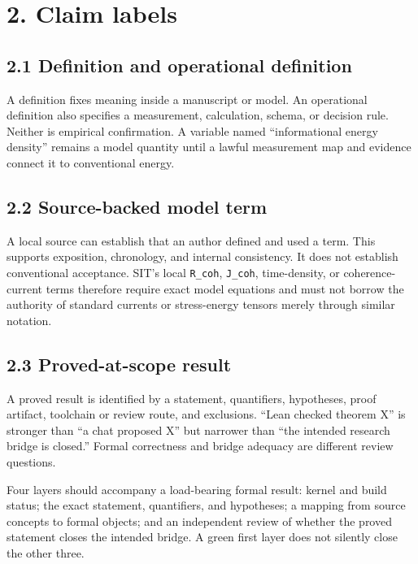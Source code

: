 \documentclass[
  american,
  11pt,
  letterpaper,
]{article}
\begin{document}
\section{2. Claim labels}\label{claim-labels}

\subsection{2.1 Definition and operational definition}\label{definition-and-operational-definition}

A definition fixes meaning inside a manuscript or model. An operational definition also specifies a measurement, calculation, schema, or decision rule. Neither is empirical confirmation. A variable named ``informational energy density'' remains a model quantity until a lawful measurement map and evidence connect it to conventional energy.

\subsection{2.2 Source-backed model term}\label{source-backed-model-term}

A local source can establish that an author defined and used a term. This supports exposition, chronology, and internal consistency. It does not establish conventional acceptance. SIT's local \texttt{R\_coh}, \texttt{J\_coh}, time-density, or coherence-current terms therefore require exact model equations and must not borrow the authority of standard currents or stress-energy tensors merely through similar notation.

\subsection{2.3 Proved-at-scope result}\label{proved-at-scope-result}

A proved result is identified by a statement, quantifiers, hypotheses, proof artifact, toolchain or review route, and exclusions. ``Lean checked theorem X'' is stronger than ``a chat proposed X'' but narrower than ``the intended research bridge is closed.'' Formal correctness and bridge adequacy are different review questions.

Four layers should accompany a load-bearing formal result: kernel and build status; the exact statement, quantifiers, and hypotheses; a mapping from source concepts to formal objects; and an independent review of whether the proved statement closes the intended bridge. A green first layer does not silently close the other three.
\end{document}
